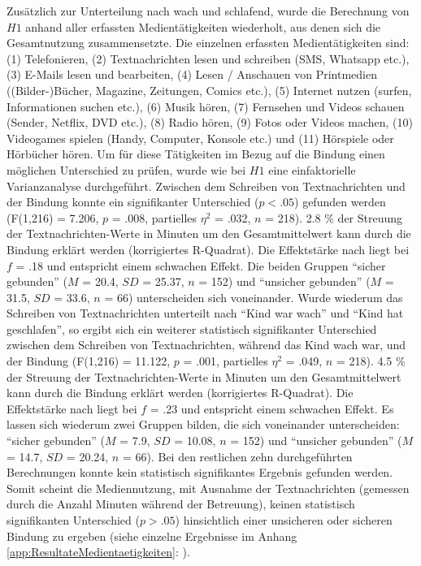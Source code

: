Zusätzlich zur Unterteilung nach wach und schlafend, wurde die Berechnung von $H1$  anhand aller erfassten Medientätigkeiten wiederholt, aus denen sich die Gesamtnutzung zusammensetzte. Die einzelnen erfassten Medientätigkeiten sind: (1) Telefonieren,  (2) Textnachrichten lesen und schreiben (SMS, Whatsapp etc.), (3) E-Mails lesen und bearbeiten, (4) Lesen / Anschauen von Printmedien ((Bilder-)Bücher, Magazine, Zeitungen, Comics etc.), (5) Internet nutzen (surfen, Informationen suchen etc.), (6) Musik hören, (7) Fernsehen und Videos schauen (Sender, Netflix, DVD etc.), (8) Radio hören, (9) Fotos oder Videos machen, (10) Videogames spielen (Handy, Computer, Konsole etc.) und (11) Hörspiele oder Hörbücher hören. Um für diese Tätigkeiten im Bezug auf die Bindung einen möglichen Unterschied zu prüfen, wurde wie bei $H1$ eine einfaktorielle Varianzanalyse durchgeführt. Zwischen dem Schreiben von Textnachrichten und der Bindung konnte ein signifikanter Unterschied ($p<.05$) gefunden werden (F(1,216) = 7.206, $p$ = .008, partielles $\eta^2$ = .032, $n$ = 218). 2.8 \% der Streuung der Textnachrichten-Werte in Minuten um den Gesamtmittelwert kann durch die Bindung erklärt werden (korrigiertes R-Quadrat). Die Effektstärke nach  liegt bei $f$ = .18 und entspricht einem schwachen Effekt. Die beiden Gruppen \enquote{sicher gebunden} ($M$ = 20.4, $SD$ = 25.37, $n$ = 152) und \enquote{unsicher gebunden} ($M$ = 31.5, $SD$ = 33.6, $n$ = 66) unterscheiden sich voneinander. Wurde wiederum das Schreiben von Textnachrichten unterteilt nach \enquote{Kind war wach} und \enquote{Kind hat geschlafen}, so ergibt sich ein weiterer statistisch signifikanter Unterschied zwischen dem Schreiben von Textnachrichten, während das Kind wach war, und der Bindung (F(1,216) = 11.122, $p$ = .001, partielles $\eta^2$ = .049, $n$ = 218). 4.5 \% der Streuung der Textnachrichten-Werte in Minuten um den Gesamtmittelwert kann durch die Bindung erklärt werden (korrigiertes R-Quadrat). Die Effektstärke nach  liegt bei $f$ = .23 und entspricht einem schwachen Effekt. Es lassen sich wiederum zwei Gruppen bilden, die sich voneinander unterscheiden: \enquote{sicher gebunden} ($M$ = 7.9, $SD$ = 10.08, $n$ = 152) und \enquote{unsicher gebunden} ($M$ = 14.7, $SD$ = 20.24, $n$ = 66). Bei den restlichen zehn durchgeführten Berechnungen konnte kein statistisch signifikantes Ergebnis gefunden werden. Somit scheint die Mediennutzung, mit Ausnahme der Textnachrichten (gemessen durch die Anzahl Minuten während der Betreuung), keinen statistisch signifikanten Unterschied ($p > .05$) hinsichtlich einer unsicheren oder sicheren Bindung zu ergeben (siehe einzelne Ergebnisse im Anhang \ref{app:ResultateMedientaetigkeiten}: \textit{}).

